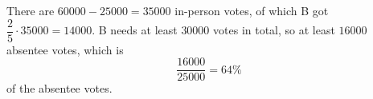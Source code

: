 There are $60000-25000=35000$ in-person votes, of which B got $\dfrac25\cdot35000=14000$. B needs at least $30000$ votes in total, so at least $16000$ absentee votes, which is
\[\dfrac{16000}{25000}=\boxed{64\%}\]
of the absentee votes.
